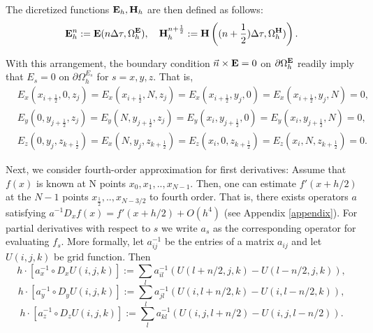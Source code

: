 \documentclass[12pt,reqno]{amsart}
\newcommand{\e}{{\bf E}}
\newcommand{\h}{{\bf H}}
\theoremstyle{definition}
\numberwithin{equation}{section}
\def\Gwh{\Omega_h}
\begin{document}
    The dicretized functions $\e_h, \h_h$ are then defined as follows:
    $$
    \e_h^n:=\e(n\Delta \tau,\Gwh^\e),\quad  \h_h^{n+\frac{1}{2}}:=\h\left ((n+\frac{1}{2})\Delta \tau,\Gwh^\h)\right).
    $$

	With this arrangement, the boundary condition 
	$\vec{n}\times {\bf E}=0$ on $\partial \Gwh^{{\bf E}}$ readily imply that 
	$E_s=0$ on $\partial \Gwh^{E_s}$ for $s=x,y,z$. That is, 
	\begin{align*}
		&
		E_x(x_{i+\frac{1}{2}},0,z_j)=E_x(x_{i+\frac{1}{2}},N,z_j)=
		E_x(x_{i+\frac{1}{2}},y_j,0)=E_x(x_{i+\frac{1}{2}},y_j, N)=0, \\&
		E_y(0,y_{j+\frac{1}{2}},z_j)=E_y(N,y_{j+\frac{1}{2}},z_j)=
		E_y(x_i,y_{j+\frac{1}{2}},0)=E_y(x_i, y_{j+\frac{1}{2}}, N)=0, \\&
		E_z(0,y_j,z_{k+\frac{1}{2}})=E_x(N,y_j,z_{k+\frac{1}{2}})=
		E_z(x_i,0,z_{k+\frac{1}{2}})=E_z(x_i,N,z_{k+\frac{1}{2}})=0. &
	\end{align*} 

	Next, we consider fourth-order approximation for first derivatives:
	Assume that $f(x)$ is known at N points $x_0,x_1, ..,x_{N-1}$. Then,  one can  estimate  $f'(x+h/2)$ at the $N-1$ points 	$x_{\frac{1}{2}},..,x_{N-3/2}$ to fourth order.
   That is, there exists operators $a$ satisfying $a^{-1}D_xf(x)=f'(x+h/2)+O(h^4)$
   (see Appendix \ref{appendix}). For partial derivatives with respect to $s$ we write $a_s$ as the corresponding operator for evaluating $f_s$. 
   More formally, let $a_{ij}^{-1}$ be the entries of a matrix $a_{ij}$ and let $U(i,j,k)$ be grid function.
   Then 
 $$h\cdot [a_x^{-1}\circ D_xU(i,j,k)]:=\sum_{l} a_{il}^{-1}(U(l+n/2,j,k)-U(l-n/2,j,k)),$$
  $$h\cdot [a_y^{-1}\circ D_yU(i,j,k)]:=\sum_{l} a_{jl}^{-1}(U(i,l+n/2,k)-U(i,l-n/2,k)),$$
   $$h\cdot [a_z^{-1}\circ D_zU(i,j,k)]:=\sum_{l} a_{kl}^{-1}(U(i,j,l+n/2)-U(i,j,l-n/2)).$$
\end{document}
